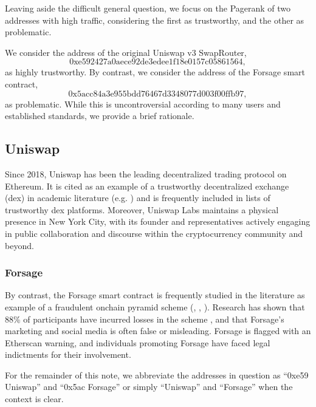 \documentclass[a4paper]{article}
\begin{document}
Leaving aside the difficult general question, we focus on the Pagerank of two addresses with high traffic, considering the first as trustworthy, and the other as problematic.

We consider the address of the original Uniswap v3 SwapRouter, $$\textrm{0xe592427a0aece92de3edee1f18e0157c05861564},$$
as highly trustworthy.  By contrast, we consider the address of the Forsage smart contract, $$\textrm{0x5acc84a3e955bdd76467d3348077d003f00ffb97},$$
as problematic.  While this is uncontroversial according to many users and established standards, we provide a brief rationale. 

\subsection{Uniswap}

Since 2018, Uniswap has been the leading decentralized trading protocol on Ethereum.  It is cited as an example of a trustworthy decentralized exchange (dex) in academic literature (e.g. \cite{Uni1, Uni2}) and is frequently included in lists of trustworthy dex platforms.  Moreover, Uniswap Labs maintains a physical presence in New York City, with its founder and representatives actively engaging in public collaboration and discourse within the cryptocurrency community and beyond.

\subsubsection{Forsage}

By contrast, the Forsage smart contract is frequently studied in the literature as example of a fraudulent onchain pyramid scheme (\cite{Forsage}, \cite{Datasets}, \cite{Ponzi}).  Research  has shown that 88\% of participants have incurred losses in the scheme \cite{Forsage}, and that Forsage's marketing and social media  is often false or misleading.  Forsage is flagged with an Etherscan warning, and individuals promoting Forsage have faced legal indictments for their involvement.

\bigskip

For the remainder of this note, we abbreviate the addresses in question as ``0xe59 Uniswap'' and ``0x5ac Forsage'' or simply ``Uniswap'' and ``Forsage'' when the context is clear.
\end{document}
